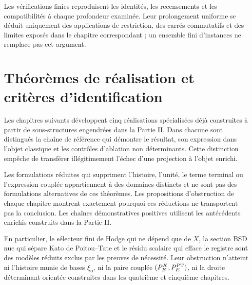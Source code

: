 Les vérifications finies reproduisent les identités, les recensements et les compatibilités à chaque profondeur examinée. Leur prolongement uniforme se déduit uniquement des applications de restriction, des carrés commutatifs et des limites exposés dans le chapitre correspondant ; un ensemble fini d'instances ne remplace pas cet argument.

\section*{Théorèmes de réalisation et critères d'identification}

Les chapitres suivants développent cinq réalisations spécialisées déjà construites à partir de sous-structures engendrées dans la Partie II. Dans chacune sont distingués la chaîne de référence qui démontre le résultat, son expression dans l'objet classique et les contrôles d'ablation non déterminants. Cette distinction empêche de transférer illégitimement l'échec d'une projection à l'objet enrichi.

Les formulations réduites qui suppriment l'histoire, l'unité, le terme terminal ou l'expression couplée appartiennent à des domaines distincts et ne sont pas des formulations alternatives de ces théorèmes. Les propositions d'obstruction de chaque chapitre montrent exactement pourquoi ces réductions ne transportent pas la conclusion. Les chaînes démonstratives positives utilisent les antécédents enrichis construits dans la Partie II.

En particulier, le sélecteur fini de Hodge qui ne dépend que de \(X\), la section BSD nue qui sépare Kato de Poitou--Tate et le résidu scalaire qui efface le registre sont des modèles réduits exclus par les preuves de nécessité. Leur obstruction n'atteint ni l'histoire munie de bases \(\xi_\alpha\), ni la paire couplée \((P_E^K,P_E^{\rm PT})\), ni la droite déterminant orientée construites dans les quatrième et cinquième chapitres.
